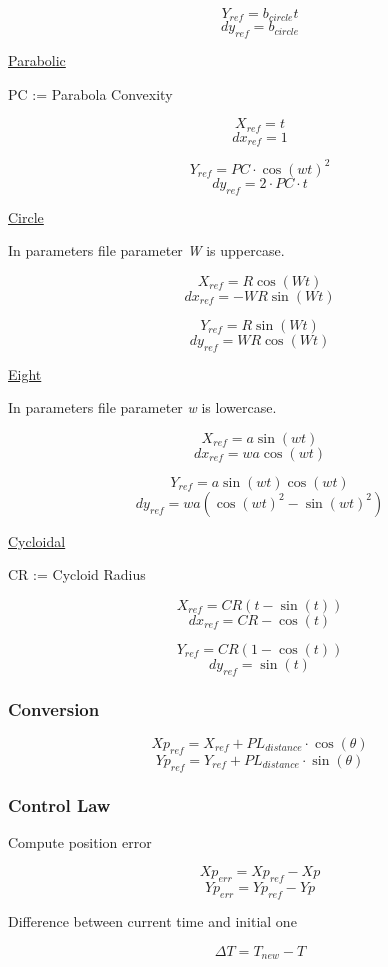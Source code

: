 \documentclass[12pt, letterpaper]{report}
\begin{document}
\[
Y_{ref} = b_{circle}t
\]
\[
dy_{ref} = b_{circle}
\]


\underline{Parabolic}

PC := Parabola Convexity

\[
X_{ref} = t
\]
\[
dx_{ref} = 1
\]

\[
Y_{ref} = PC \cdot \cos(wt)^2
\]
\[
dy_{ref} = 2 \cdot PC \cdot t
\]


\underline{Circle}

In parameters file parameter \textit{W} is uppercase.

\[
X_{ref} = R\cos(Wt)
\]
\[
dx_{ref} = -WR\sin(Wt)
\]

\[
Y_{ref} = R\sin(Wt)
\]
\[
dy_{ref} = WR\cos(Wt)
\]


\underline{Eight}

In parameters file parameter \textit{w} is lowercase.

\[
X_{ref} = a\sin(wt)
\]
\[
dx_{ref} = wa\cos(wt)
\]

\[
Y_{ref} = a\sin(wt)\cos(wt)
\]
\[
dy_{ref} = wa(\cos(wt)^2 - \sin(wt)^2)
\]


\underline{Cycloidal}

CR := Cycloid Radius

\[
X_{ref} = CR(t - \sin(t))
\]
\[
dx_{ref} = CR - \cos(t)
\]

\[
Y_{ref} = CR(1 - \cos(t))
\]
\[
dy_{ref} = \sin(t)
\]

\subsubsection{Conversion}

\[
Xp_{ref} = X_{ref} + PL_{distance} \cdot \cos(\theta)
\]
\[
Yp_{ref} = Y_{ref} + PL_{distance} \cdot \sin(\theta)
\]

\subsubsection{Control Law}

Compute position error

\[
Xp_{err} = Xp_{ref} - Xp
\]
\[
Yp_{err} = Yp_{ref} - Yp
\]


Difference between current time and initial one

\[
\Delta T = T_{new} - T
\]
\end{document}

